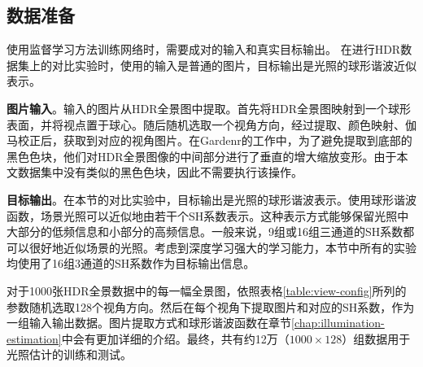 \subsection{数据准备}
使用监督学习方法训练网络时，需要成对的输入和真实目标输出。
在进行HDR数据集上的对比实验时，使用的输入是普通的图片，目标输出是光照的球形谐波近似表示。

\textbf{图片输入}。输入的图片从HDR全景图中提取。首先将HDR全景图映射到一个球形表面，并将视点置于球心。随后随机选取一个视角方向，经过提取、颜色映射、伽马校正后，获取到对应的视角图片。在Gardenr\cite{gardner2017learning}的工作中，为了避免提取到底部的黑色色块，他们对HDR全景图像的中间部分进行了垂直的增大缩放变形。由于本文数据集中没有类似的黑色色块，因此不需要执行该操作。

\textbf{目标输出}。在本节的对比实验中，目标输出是光照的球形谐波表示。使用球形谐波函数，场景光照可以近似地由若干个SH系数表示。这种表示方式能够保留光照中大部分的低频信息和小部分的高频信息。一般来说，9组或16组三通道的SH系数都可以很好地近似场景的光照。考虑到深度学习强大的学习能力，本节中所有的实验均使用了16组3通道的SH系数作为目标输出信息。


对于1000张HDR全景数据中的每一幅全景图，依照表格\ref{table:view-config}所列的参数随机选取128个视角方向。然后在每个视角下提取图片和对应的SH系数，作为一组输入输出数据。图片提取方式和球形谐波函数在章节\ref{chap:illumination-estimation}中会有更加详细的介绍。最终，共有约12万（$1000\times128$）组数据用于光照估计的训练和测试。

